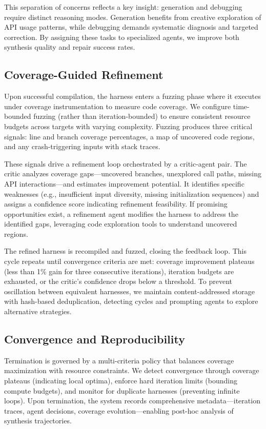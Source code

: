 \documentclass[sigconf,review,anonymous]{acmart}
\begin{document}
This separation of concerns reflects a key insight: generation and debugging require distinct reasoning modes. Generation benefits from creative exploration of API usage patterns, while debugging demands systematic diagnosis and targeted correction. By assigning these tasks to specialized agents, we improve both synthesis quality and repair success rates.

\subsection{Coverage-Guided Refinement}

Upon successful compilation, the harness enters a fuzzing phase where it executes under coverage instrumentation to measure code coverage. We configure time-bounded fuzzing (rather than iteration-bounded) to ensure consistent resource budgets across targets with varying complexity. Fuzzing produces three critical signals: line and branch coverage percentages, a map of uncovered code regions, and any crash-triggering inputs with stack traces.

These signals drive a refinement loop orchestrated by a critic-agent pair. The critic analyzes coverage gaps—uncovered branches, unexplored call paths, missing API interactions—and estimates improvement potential. It identifies specific weaknesses (e.g., insufficient input diversity, missing initialization sequences) and assigns a confidence score indicating refinement feasibility. If promising opportunities exist, a refinement agent modifies the harness to address the identified gaps, leveraging code exploration tools to understand uncovered regions.

The refined harness is recompiled and fuzzed, closing the feedback loop. This cycle repeats until convergence criteria are met: coverage improvement plateaus (less than 1\% gain for three consecutive iterations), iteration budgets are exhausted, or the critic's confidence drops below a threshold. To prevent oscillation between equivalent harnesses, we maintain content-addressed storage with hash-based deduplication, detecting cycles and prompting agents to explore alternative strategies.

\subsection{Convergence and Reproducibility}

Termination is governed by a multi-criteria policy that balances coverage maximization with resource constraints. We detect convergence through coverage plateaus (indicating local optima), enforce hard iteration limits (bounding compute budgets), and monitor for duplicate harnesses (preventing infinite loops). Upon termination, the system records comprehensive metadata—iteration traces, agent decisions, coverage evolution—enabling post-hoc analysis of synthesis trajectories.
\end{document}
